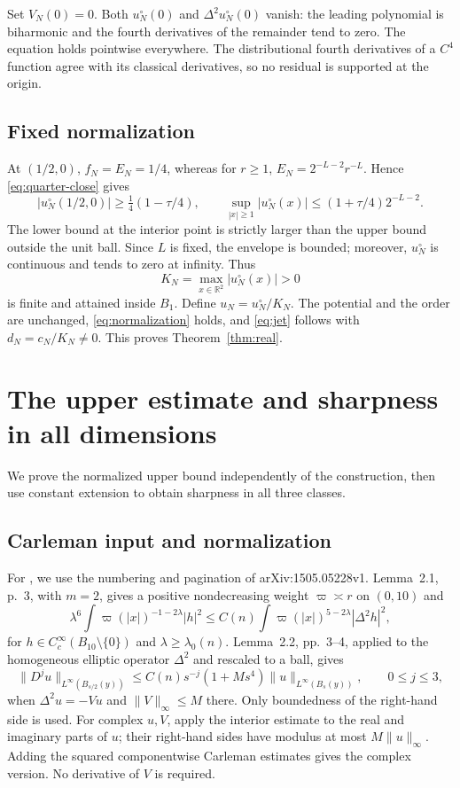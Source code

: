 \documentclass[11pt,twoside,leqno]{article}
\numberwithin{equation}{section}
\theoremstyle{definition}
\theoremstyle{remark}
\newcommand{\R}{\mathbb R}
\begin{document}
Set $V_N(0)=0$. Both $u_N^\circ(0)$ and $\Delta^2u_N^\circ(0)$
vanish: the leading polynomial is biharmonic and the fourth derivatives
of the remainder tend to zero. The equation holds pointwise everywhere.
The distributional fourth derivatives of a $C^4$ function agree with
its classical derivatives, so no residual is supported at the origin.

\subsection{Fixed normalization}

At $(1/2,0)$, $f_N=E_N=1/4$, whereas for $r\ge1$,
$E_N=2^{-L-2}r^{-L}$. Hence \eqref{eq:quarter-close} gives
\[
 |u_N^\circ(1/2,0)|\ge\tfrac14(1-\tau/4),\qquad
 \sup_{|x|\ge1}|u_N^\circ(x)|\le(1+\tau/4)2^{-L-2}.
\]
The lower bound at the interior point is strictly larger than the
upper bound outside the unit ball. Since $L$ is fixed, the envelope
is bounded; moreover, $u_N^\circ$ is continuous and tends to zero at
infinity.
Thus
\[
 K_N=\max_{x\in\R^2}|u_N^\circ(x)|>0
\]
is finite and attained inside $B_1$. Define $u_N=u_N^\circ/K_N$.
The potential and the order are unchanged, \eqref{eq:normalization}
holds, and \eqref{eq:jet} follows with $d_N=c_N/K_N\ne0$.
This proves Theorem~\ref{thm:real}.

\section{The upper estimate and sharpness in all dimensions}\label{sec:upper}

We prove the normalized upper bound independently of the construction,
then use constant extension to obtain sharpness in all three classes.

\subsection{Carleman input and normalization}

For \cite{HWZ}, we use the numbering and pagination of
arXiv:1505.05228v1. Lemma~2.1, p.~3, with $m=2$, gives a positive
nondecreasing weight
$\varpi\asymp r$ on $(0,10)$ and
\begin{equation}\label{eq:Carleman}
 \lambda^6\int\varpi(|x|)^{-1-2\lambda}|h|^2
 \le C(n)\int\varpi(|x|)^{5-2\lambda}|\Delta^2h|^2,
\end{equation}
for $h\in C_c^\infty(B_{10}\setminus\{0\})$ and
$\lambda\ge\lambda_0(n)$. Lemma~2.2, pp.~3--4, applied to the
homogeneous elliptic operator $\Delta^2$ and rescaled to a ball, gives
\begin{equation}\label{eq:interior}
 \|D^ju\|_{L^\infty(B_{s/2}(y))}
 \le C(n)s^{-j}(1+Ms^4)\|u\|_{L^\infty(B_s(y))},\qquad0\le j\le3,
\end{equation}
when $\Delta^2u=-Vu$ and $\|V\|_\infty\le M$ there.
Only boundedness of the right-hand side is used. For complex $u,V$,
apply the interior estimate to the real and imaginary parts of $u$;
their right-hand sides have modulus at most $M\|u\|_\infty$.
Adding the squared componentwise Carleman estimates gives the complex
version. No derivative of $V$ is required.
\end{document}
